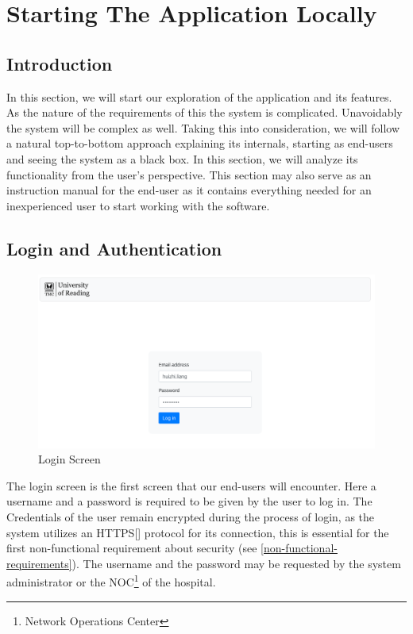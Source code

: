 \chapter{Starting The Application Locally}
\label{start-stop-guide}
	\section{Introduction}
		In this section, we will start our exploration of the application and its features. As the nature of the requirements of this
		the system is complicated. Unavoidably the system will be complex as well. Taking this into consideration, we will follow a natural top-to-bottom
		approach explaining its internals, starting as end-users and seeing the system as a black box. In this section, we will analyze its 
		functionality from the user's perspective. This section may also serve as an instruction manual for the end-user as it contains everything needed
		for an inexperienced user to start working with the software.
	\section{Login and Authentication}
		\begin{figure}[H]
			\iftrue
			\centering
			\caption{Login Screen}
			\includegraphics[scale=0.3]{figures/login}
			\fi
		\end{figure}
		The login screen is the first screen that our end-users will encounter. Here a username and a password is required to be given by the 
		user to log in. The Credentials of the user remain encrypted during the process of login, as the system utilizes an HTTPS[\cite{rfc2818}] 
		protocol for its connection, this is essential for the first non-functional requirement about security (see \ref{non-functional-requirements}).
		The username and the password may be requested by the system administrator or the NOC\footnote{Network Operations Center} of the hospital.
